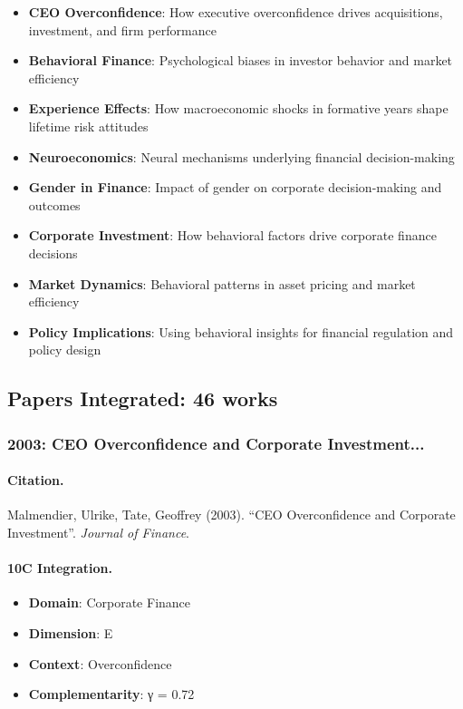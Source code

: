 \begin{itemize}
  \item \textbf{CEO Overconfidence}: How executive overconfidence drives acquisitions, investment, and firm performance
  \item \textbf{Behavioral Finance}: Psychological biases in investor behavior and market efficiency
  \item \textbf{Experience Effects}: How macroeconomic shocks in formative years shape lifetime risk attitudes
  \item \textbf{Neuroeconomics}: Neural mechanisms underlying financial decision-making
  \item \textbf{Gender in Finance}: Impact of gender on corporate decision-making and outcomes
  \item \textbf{Corporate Investment}: How behavioral factors drive corporate finance decisions
  \item \textbf{Market Dynamics}: Behavioral patterns in asset pricing and market efficiency
  \item \textbf{Policy Implications}: Using behavioral insights for financial regulation and policy design
\end{itemize}

\subsection{Papers Integrated: 46 works}


\subsubsection{2003: CEO Overconfidence and Corporate Investment...}

\paragraph{Citation.}
Malmendier, Ulrike, Tate, Geoffrey (2003). ``CEO Overconfidence and Corporate Investment''. \textit{Journal of Finance}.

\paragraph{10C Integration.}
\begin{itemize}[nosep]
  \item \textbf{Domain}: Corporate Finance
  \item \textbf{Dimension}: E
  \item \textbf{Context}: Overconfidence
  \item \textbf{Complementarity}: γ = 0.72
\end{itemize}


